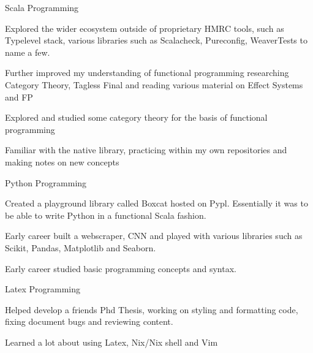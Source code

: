 \begin{cventries}
  \cventry
  {Scala Programming} %
  {} %
  {} %
  {} %
  {
    \begin{cvitems}
      \item {Explored the wider ecosystem outside of proprietary HMRC tools, such as Typelevel stack, various libraries such as Scalacheck, Pureconfig, WeaverTests to name a few.}
      \item {Further improved my understanding of functional programming researching Category Theory, Tagless Final and reading various material on Effect Systems and FP}
      \item {Explored and studied some category theory for the basis of functional programming}
      \item {Familiar with the native library, practicing within my own repositories and making notes on new concepts}
    \end{cvitems}
  }
  \cventry
  {Python Programming} %
  {} %
  {} %
  {} %
  {
    \begin{cvitems}
      \item {Created a playground library called Boxcat hosted on Pypl. Essentially it was to be able to write Python in a functional Scala fashion.}
      \item {Early career built a webscraper, CNN and played with various libraries such as Scikit, Pandas, Matplotlib and Seaborn.}
      \item {Early career studied basic programming concepts and syntax.}
    \end{cvitems}
  }
\cventry
{Latex Programming} %
{} %
{} %
{} %
{
  \begin{cvitems}
    \item {Helped develop a friends Phd Thesis, working on styling and formatting code, fixing document bugs and reviewing content.}
    \item {Learned a lot about using Latex, Nix/Nix shell and Vim}
  \end{cvitems}
}


\end{cventries}
